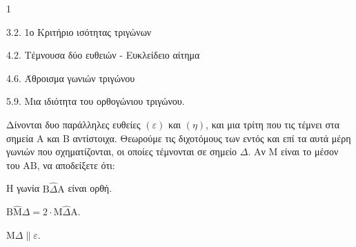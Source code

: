 \begin{ylh}{1}
    \item 3.2. 1ο Κριτήριο ισότητας τριγώνων
    \item 4.2. Τέμνουσα δύο ευθειών - Ευκλείδειο αίτημα
    \item 4.6. Άθροισμα γωνιών τριγώνου
    \item 5.9. Μια ιδιότητα του ορθογώνιου τριγώνου.
\end{ylh}
Δίνονται δυο παράλληλες ευθείες $(\varepsilon)$ και $(\eta)$, και μια τρίτη που τις τέμνει στα σημεία $\mathrm{A}$ και $\mathrm{B}$ αντίστοιχα. Θεωρούμε τις διχοτόμους των εντός και επί τα αυτά μέρη γωνιών που σχηματίζονται, οι οποίες τέμνονται σε σημείο $\Delta$. Αν $\mathrm{M}$ είναι το μέσον του $\mathrm{A}\mathrm{B}$, να αποδείξετε ότι:
\begin{alist}
    \item Η γωνία $\mathrm{B}\hat{\Delta}\mathrm{A}$ είναι ορθή. 
    \item $\mathrm{B}\hat{\mathrm{M}}\Delta = 2 \cdot \mathrm{M}\hat{\Delta}\mathrm{A}$. 
    \item $\mathrm{M}\Delta \parallel \varepsilon$. 
\end{alist}

